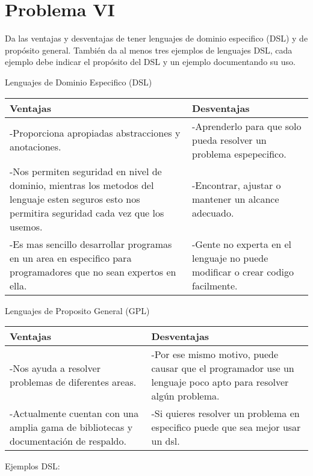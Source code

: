 \documentclass{article}
\begin{document}
\section*{Problema VI}
Da las ventajas y desventajas de tener lenguajes de dominio especifico (DSL)
y de propósito general. También da al menos tres ejemplos de lenguajes DSL,
cada ejemplo debe indicar el propósito del DSL y un ejemplo documentando su uso.
\\
\begin{center}
Lenguajes de Dominio Especifico (DSL)
\end{center}
\begin{tabularx}{\textwidth}{X|X}
	  \textbf{Ventajas} & \textbf{Desventajas} \\
	\hline
	-Proporciona apropiadas abstracciones y anotaciones. & -Aprenderlo para que solo pueda resolver un problema espepecifico.\\
	-Nos permiten seguridad en nivel de dominio, mientras los metodos del lenguaje esten seguros esto nos permitira seguridad cada vez que los usemos. & -Encontrar, ajustar o mantener un alcance adecuado.\\
	-Es mas sencillo desarrollar programas en un area en especifico para programadores que no sean expertos en ella. & -Gente no experta en el lenguaje no puede modificar o crear codigo facilmente.\\
\end{tabularx}

\begin{center}
Lenguajes de Proposito General (GPL)
\end{center}
\begin{tabularx}{\textwidth}{X|X}
	  \textbf{Ventajas} & \textbf{Desventajas} \\
	\hline
	-Nos ayuda a resolver problemas de diferentes areas. & -Por ese mismo motivo, puede causar que el programador use un lenguaje poco apto para resolver algún problema.\\
	-Actualmente cuentan con una amplia gama de bibliotecas y documentación de respaldo. & -Si quieres resolver un problema en especifico puede que sea mejor usar un dsl.\\
	
\end{tabularx}
\begin{center}
Ejemplos DSL:
\end{center}
\end{document}
